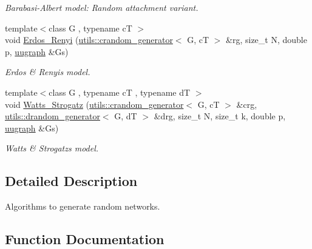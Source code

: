 \begin{DoxyCompactItemize}
\begin{DoxyCompactList}\small\item\em Barabasi-\/\+Albert model\+: Random attachment variant. \end{DoxyCompactList}\item 
{\footnotesize template$<$class G , typename cT $>$ }\\void \hyperlink{namespacelgraph_1_1networks_1_1random_a60caa31846c7375914dee572486812f4}{Erdos\+\_\+\+Renyi} (\hyperlink{classlgraph_1_1utils_1_1crandom__generator}{utils\+::crandom\+\_\+generator}$<$ G, cT $>$ \&rg, size\+\_\+t N, double p, \hyperlink{classlgraph_1_1uugraph}{uugraph} \&Gs)
\begin{DoxyCompactList}\small\item\em Erdos \& Renyi\textquotesingle{}s model. \end{DoxyCompactList}\item 
{\footnotesize template$<$class G , typename cT , typename dT $>$ }\\void \hyperlink{namespacelgraph_1_1networks_1_1random_ae9b1c3a417dd89c2b647ffe89173ab65}{Watts\+\_\+\+Strogatz} (\hyperlink{classlgraph_1_1utils_1_1crandom__generator}{utils\+::crandom\+\_\+generator}$<$ G, cT $>$ \&crg, \hyperlink{classlgraph_1_1utils_1_1drandom__generator}{utils\+::drandom\+\_\+generator}$<$ G, dT $>$ \&drg, size\+\_\+t N, size\+\_\+t k, double p, \hyperlink{classlgraph_1_1uugraph}{uugraph} \&Gs)
\begin{DoxyCompactList}\small\item\em Watts \& Strogatz\textquotesingle{}s model. \end{DoxyCompactList}\end{DoxyCompactItemize}


\subsection{Detailed Description}
Algorithms to generate random networks. 

\subsection{Function Documentation}
\mbox{\label{namespacelgraph_1_1networks_1_1random_ab7e205d59b9526aa28812c93059ec327}} 
